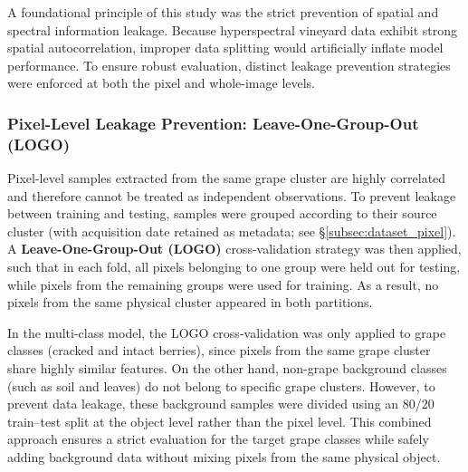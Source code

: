 \noindent
A foundational principle of this study was the strict prevention of spatial and spectral information leakage. Because hyperspectral vineyard data exhibit strong spatial autocorrelation, improper data splitting would artificially inflate model performance. To ensure robust evaluation, distinct leakage prevention strategies were enforced at both the pixel and whole-image levels.

\subsubsection{Pixel-Level Leakage Prevention: Leave-One-Group-Out (LOGO)}
\label{subsec:cv_strategy}

\noindent
Pixel-level samples extracted from the same grape cluster are highly correlated and therefore cannot be treated as independent observations. To prevent leakage between training and testing, samples were grouped according to their source cluster (with acquisition date retained as metadata; see \S\ref{subsec:dataset_pixel}). A \textbf{Leave-One-Group-Out (LOGO)} cross-validation strategy was then applied, such that in each fold, all pixels belonging to one group were held out for testing, while pixels from the remaining groups were used for training. As a result, no pixels from the same physical cluster appeared in both partitions.

\medskip
\noindent
In the multi-class model, the LOGO cross-validation was only applied to grape classes (cracked and intact berries), since pixels from the same grape cluster share highly similar features. On the other hand, non-grape background classes (such as soil and leaves) do not belong to specific grape clusters. However, to prevent data leakage, these background samples were divided using an 80/20 train--test split at the object level rather than the pixel level. This combined approach ensures a strict evaluation for the target grape classes while safely adding background data without mixing pixels from the same physical object.

